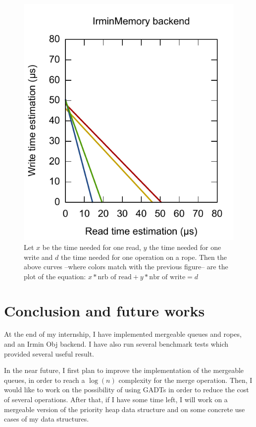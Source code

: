 \documentclass{article}
\newcommand{\irmin}{Irmin\xspace}
\newcommand{\obj}{Obj\xspace}
\begin{document}
\begin{figure}[hbt]
\includegraphics[scale=0.6]{images/mem_interp.pdf}
\caption{Let $x$ be the time needed for one read, $y$ the time needed for one write and $d$ the time needed for one operation on a rope. Then the above curves --where colors match with the previous figure-- are the plot of the equation: $x * \mbox{nrb of read} + y * \mbox{nbr of write} = d$}
\label{interpolation}
\end{figure}

\FloatBarrier

\section{Conclusion and future works}

At the end of my internship, I have implemented mergeable queues and ropes, and an \irmin \obj backend.
I have also run several benchmark tests which provided several useful result.

In the near future, I first plan to improve the implementation of the mergeable queues, in order to reach a $\log(n)$ complexity for the merge operation.
Then, I would like to work on the possibility of using GADTs in order to reduce the cost of several operations.
After that, if I have some time left, I will work on a mergeable version of the priority heap data structure and on some concrete use cases of my data structures.
\end{document}
